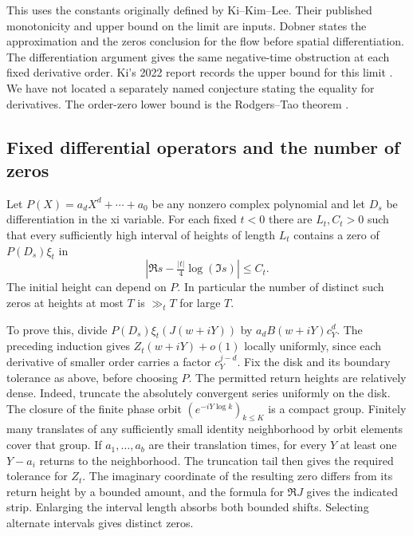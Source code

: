 \documentclass[11pt,a4paper]{article}
\begin{document}
\medskip\noindent
This uses the constants originally defined by Ki--Kim--Lee. Their
published monotonicity and upper bound on the limit are inputs.
Dobner states the approximation and the zeros conclusion for the
flow before spatial differentiation. The differentiation argument gives the same negative-time
obstruction at each fixed derivative order. Ki's 2022 report records the upper bound for this limit
\cite{Ki22}. We have not located a separately named conjecture stating
the equality for derivatives. The order-zero lower bound is the
Rodgers--Tao theorem \cite{RT}.

\subsection{Fixed differential operators and the number of zeros}
Let $P(X)=a_dX^d+\cdots+a_0$ be any nonzero complex polynomial and
let $D_s$ be differentiation in the xi variable.  For each fixed $t<0$
there are $L_t,C_t>0$ such that every sufficiently high interval of
heights of length $L_t$ contains a zero of $P(D_s)\xi_t$ in
\[
 \left|\Re s-\tfrac{|t|}{4}\log(\Im s)\right|\le C_t .
\]
The initial height can depend on $P$. In particular the number of
distinct such zeros at heights at most $T$ is $\gg_t T$ for large $T$.

To prove this, divide $P(D_s)\xi_t(J(w+iY))$ by $a_d B(w+iY)c_Y^d$.
The preceding induction gives $Z_t(w+iY)+o(1)$ locally uniformly, since
each derivative of smaller order carries a factor $c_Y^{j-d}$.
Fix the disk and its boundary tolerance as above, before choosing $P$.
The permitted return heights are relatively dense.
Indeed, truncate the absolutely convergent series uniformly on the disk.
The closure of the finite phase orbit
$(e^{-iY\log k})_{k\le K}$ is a compact group.
Finitely many translates of any sufficiently small identity
neighborhood by orbit elements cover that group. If $a_1,\ldots,a_b$
are their translation times, for every $Y$ at least one
$Y-a_i$ returns to the neighborhood. The truncation tail then gives
the required tolerance for $Z_t$. The imaginary coordinate of the resulting
zero differs from its return height by a bounded amount, and the formula
for $\Re J$ gives the indicated strip. Enlarging the interval length
absorbs both bounded shifts. Selecting alternate intervals gives
distinct zeros.
\end{document}
